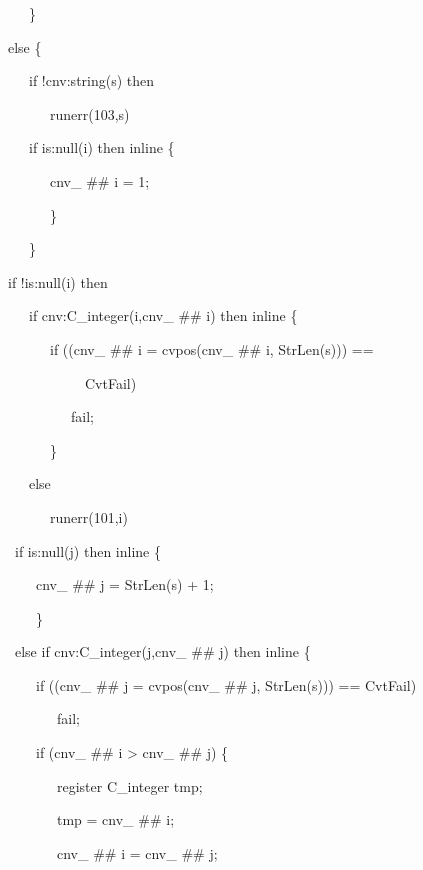 {\ttfamily\mdseries
\ \ \ \ \ \ \}}

{\ttfamily\mdseries
\ \ \ else \{}

{\ttfamily\mdseries
\ \ \ \ \ \ if !cnv:string(s) then}

{\ttfamily\mdseries
\ \ \ \ \ \ \ \ \ runerr(103,s)}

{\ttfamily\mdseries
\ \ \ \ \ \ if is:null(i) then inline \{}

{\ttfamily\mdseries
\ \ \ \ \ \ \ \ \ cnv\_ \#\# i = 1;}

{\ttfamily\mdseries
\ \ \ \ \ \ \ \ \ \}}

{\ttfamily\mdseries
\ \ \ \ \ \ \}}


\bigskip

{\ttfamily\mdseries
\ \ \ if !is:null(i) then}

{\ttfamily\mdseries
\ \ \ \ \ \ if cnv:C\_integer(i,cnv\_ \#\# i) then inline \{}

{\ttfamily\mdseries
\ \ \ \ \ \ \ \ \ if ((cnv\_ \#\# i = cvpos(cnv\_ \#\# i, StrLen(s))) ==}

{\ttfamily\mdseries
\ \ \ \ \ \ \ \ \ \ \ \ \ \ CvtFail)}

{\ttfamily\mdseries
\ \ \ \ \ \ \ \ \ \ \ \ fail;}

{\ttfamily\mdseries
\ \ \ \ \ \ \ \ \ \}}

{\ttfamily\mdseries
\ \ \ \ \ \ else}

{\ttfamily\mdseries
\ \ \ \ \ \ \ \ \ runerr(101,i)}


\bigskip

{\ttfamily\mdseries
\ \ \ \ if is:null(j) then inline \{}

{\ttfamily\mdseries
\ \ \ \ \ \ \ cnv\_ \#\# j = StrLen(s) + 1;}

{\ttfamily\mdseries
\ \ \ \ \ \ \ \}}

{\ttfamily\mdseries
\ \ \ \ else if cnv:C\_integer(j,cnv\_ \#\# j) then inline \{}

{\ttfamily\mdseries
\ \ \ \ \ \ \ if ((cnv\_ \#\# j = cvpos(cnv\_ \#\# j, StrLen(s))) == CvtFail)}

{\ttfamily\mdseries
\ \ \ \ \ \ \ \ \ \ fail;}

{\ttfamily\mdseries
\ \ \ \ \ \ \ if (cnv\_ \#\# i {\textgreater} cnv\_ \#\# j) \{}

{\ttfamily\mdseries
\ \ \ \ \ \ \ \ \ \ register C\_integer tmp;}

{\ttfamily\mdseries
\ \ \ \ \ \ \ \ \ \ tmp = cnv\_ \#\# i;}

{\ttfamily\mdseries
\ \ \ \ \ \ \ \ \ \ cnv\_ \#\# i = cnv\_ \#\# j;}


